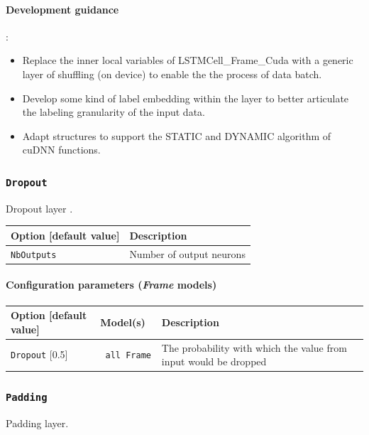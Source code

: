 \documentclass[a4paper,11pt,oneside]{article}
\begin{document}
\paragraph{Development guidance}:
\begin{itemize}
\item Replace the inner local variables of LSTMCell\_Frame\_Cuda with a generic layer of shuffling (on device) to enable the the process of data batch.
\item Develop some kind of label embedding within the layer to better articulate the labeling granularity of the input data.
\item Adapt structures to support the STATIC and DYNAMIC algorithm of cuDNN functions.
\end{itemize}

\subsubsection{\texorpdfstring{%
\lstinline[basicstyle=\ttfamily\bfseries]!Dropout!}{Dropout}}
Dropout layer \citep{Srivastava2014}.

\begin{center}
 \begin{longtable}{| p{5cm} | p{10cm} | }
 \hline
 Option [default value] & Description\\
 \hline\hline
  \cellcolor{requiredcolor}\lstinline!NbOutputs! & Number of output neurons \\
 \hline
\end{longtable}
\end{center}

\paragraph{Configuration parameters (\emph{Frame} models)}

\begin{center}
 \begin{longtable}{| p{4cm} | p{3cm} | p{9cm} | }
 \hline
 Option [default value] & Model(s) & Description\\
 \hline\hline
  \lstinline!Dropout! [0.5] & \lstinline! all Frame ! & The probability with
  which the value from input would be dropped \\
 \hline
\end{longtable}
\end{center}

\subsubsection{\texorpdfstring{%
\lstinline[basicstyle=\ttfamily\bfseries]!Padding!}{Padding}}
Padding layer.
\end{document}
